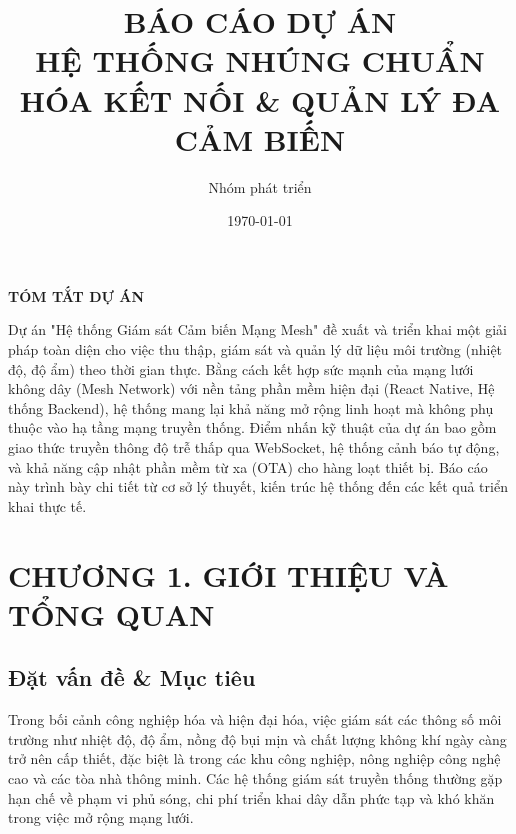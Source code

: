 \documentclass{article}
\title{\textbf{BÁO CÁO DỰ ÁN}\\ \Large HỆ THỐNG NHÚNG CHUẨN HÓA KẾT NỐI & QUẢN LÝ ĐA CẢM BIẾN}
\author{Nhóm phát triển}
\date{\today}
\begin{document}

\thispagestyle{empty}
\newpage

\vspace*{2cm}
\begin{center}
    \fontsize{18pt}{24pt}\selectfont \textbf{TÓM TẮT DỰ ÁN}
\end{center}
\vspace{1cm}
\noindent Dự án "Hệ thống Giám sát Cảm biến Mạng Mesh" đề xuất và triển khai một giải pháp toàn diện cho việc thu thập, giám sát và quản lý dữ liệu môi trường (nhiệt độ, độ ẩm) theo thời gian thực. Bằng cách kết hợp sức mạnh của mạng lưới không dây (Mesh Network) với nền tảng phần mềm hiện đại (React Native, Hệ thống Backend), hệ thống mang lại khả năng mở rộng linh hoạt mà không phụ thuộc vào hạ tầng mạng truyền thống. Điểm nhấn kỹ thuật của dự án bao gồm giao thức truyền thông độ trễ thấp qua WebSocket, hệ thống cảnh báo tự động, và khả năng cập nhật phần mềm từ xa (OTA) cho hàng loạt thiết bị. Báo cáo này trình bày chi tiết từ cơ sở lý thuyết, kiến trúc hệ thống đến các kết quả triển khai thực tế.
\thispagestyle{empty}
\newpage

\tableofcontents 
\thispagestyle{empty}
\newpage

{\let\oldnumberline\numberline
\renewcommand{\numberline}{Hình~\oldnumberline}
\listoffigures} 
\newpage

{\let\oldnumberline\numberline
\renewcommand{\numberline}{Bảng~\oldnumberline}
\listoftables}
\newpage


\section*{CHƯƠNG 1. GIỚI THIỆU VÀ TỔNG QUAN}
\setcounter{section}{1}
\setcounter{subsection}{0}

\subsection{Đặt vấn đề \& Mục tiêu}
Trong bối cảnh công nghiệp hóa và hiện đại hóa, việc giám sát các thông số môi trường như nhiệt độ, độ ẩm, nồng độ bụi mịn và chất lượng không khí ngày càng trở nên cấp thiết, đặc biệt là trong các khu công nghiệp, nông nghiệp công nghệ cao và các tòa nhà thông minh. Các hệ thống giám sát truyền thống thường gặp hạn chế về phạm vi phủ sóng, chi phí triển khai dây dẫn phức tạp và khó khăn trong việc mở rộng mạng lưới. 
\end{document}
